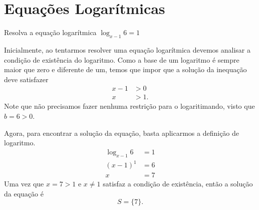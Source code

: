 \section{Equações Logarítmicas}

\begin{example}
  Resolva a equação logarítmica
  \(
    \log_{x-1} 6 = 1
  \)

  \solution
  Inicialmente, ao tentarmos resolver uma equação logarítmica devemos
  analisar a condição de existência do logaritmo. Como a base de um
  logaritmo é sempre maior que zero e diferente de um, temos que impor
  que a solução da inequação deve satisfazer
  \begin{align*}
    x-1 & > 0 \\
    x   & > 1.
  \end{align*}
  Note que não precisamos fazer nenhuma restrição para o
  logaritimando, visto que $b=6>0$.

  Agora, para encontrar a solução da equação, basta aplicarmos a
  definição de logaritmo.
  \begin{align*}
    \log_{x-1}6 & = 1  \\
    (x-1)^1     & = 6  \\
    x           & = 7
  \end{align*}
  Uma vez que $x=7>1$ e $x\neq1$ satisfaz a condição de existência,
  então a solução da equação é
  \[
    S = \{ 7\}.
  \]
\end{example}


